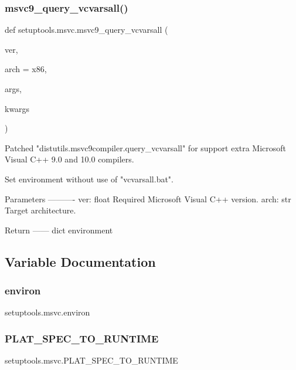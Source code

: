 \subsubsection{\texorpdfstring{msvc9\+\_\+query\+\_\+vcvarsall()}{msvc9\_query\_vcvarsall()}}
{\footnotesize\ttfamily def setuptools.\+msvc.\+msvc9\+\_\+query\+\_\+vcvarsall (\begin{DoxyParamCaption}\item[{}]{ver,  }\item[{}]{arch = {\ttfamily \textquotesingle{}x86\textquotesingle{}},  }\item[{}]{args,  }\item[{}]{kwargs }\end{DoxyParamCaption})}

\begin{DoxyVerb}Patched "distutils.msvc9compiler.query_vcvarsall" for support extra
Microsoft Visual C++ 9.0 and 10.0 compilers.

Set environment without use of "vcvarsall.bat".

Parameters
----------
ver: float
    Required Microsoft Visual C++ version.
arch: str
    Target architecture.

Return
------
dict
    environment
\end{DoxyVerb}
 

\subsection{Variable Documentation}
\mbox{\label{namespacesetuptools_1_1msvc_a8bd7d4dc579a6378c5a0eecdd3e297f0}} 
\subsubsection{\texorpdfstring{environ}{environ}}
{\footnotesize\ttfamily setuptools.\+msvc.\+environ}

\mbox{\label{namespacesetuptools_1_1msvc_a8c44cd3283c29885e2f51a76d5b4fdd9}} 
\subsubsection{\texorpdfstring{P\+L\+A\+T\+\_\+\+S\+P\+E\+C\+\_\+\+T\+O\+\_\+\+R\+U\+N\+T\+I\+ME}{PLAT\_SPEC\_TO\_RUNTIME}}
{\footnotesize\ttfamily setuptools.\+msvc.\+P\+L\+A\+T\+\_\+\+S\+P\+E\+C\+\_\+\+T\+O\+\_\+\+R\+U\+N\+T\+I\+ME}

